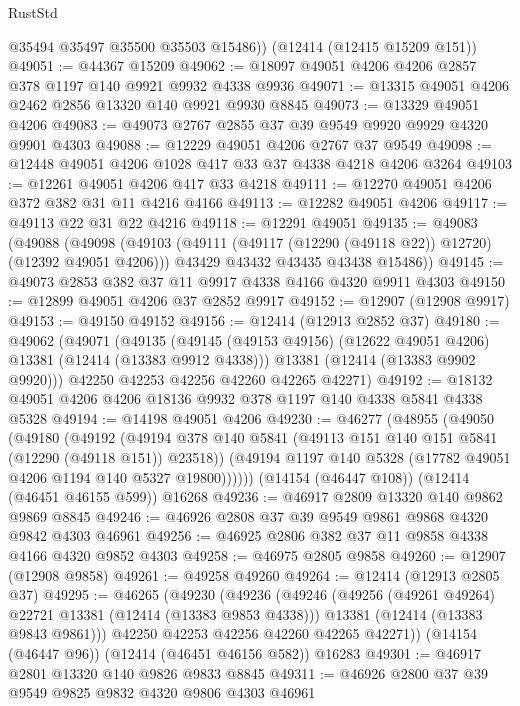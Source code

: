 \begin{lexlean}{RustStd}
\begin{coremodule}
{\begin{coremodule}
{{{{{{{{{{{{{{{{{{{{{{{{{{{{{{{{{{{{{{{{{{{{{{{{{{        @35494
        @35497
        @35500
        @35503
        @15486))
    (@12414 (@12415 @15209 @151))
@49051 := @44367 @15209
@49062 := @18097 @49051 @4206 @4206 @2857 @378 @1197 @140 @9921 @9932 @4338 @9936
@49071 := @13315 @49051 @4206 @2462 @2856 @13320 @140 @9921 @9930 @8845
@49073 := @13329 @49051 @4206
@49083 := @49073 @2767 @2855 @37 @39 @9549 @9920 @9929 @4320 @9901 @4303
@49088 := @12229 @49051 @4206 @2767 @37 @9549
@49098 := @12448 @49051 @4206 @1028 @417 @33 @37 @4338 @4218 @4206 @3264
@49103 := @12261 @49051 @4206 @417 @33 @4218
@49111 := @12270 @49051 @4206 @372 @382 @31 @11 @4216 @4166
@49113 := @12282 @49051 @4206
@49117 := @49113 @22 @31 @22 @4216
@49118 := @12291 @49051
@49135 := @49083
    (@49088
      (@49098
        (@49103 (@49111 (@49117 (@12290 (@49118 @22)) @12720) (@12392 @49051 @4206)))
        @43429
        @43432
        @43435
        @43438
        @15486))
@49145 := @49073 @2853 @382 @37 @11 @9917 @4338 @4166 @4320 @9911 @4303
@49150 := @12899 @49051 @4206 @37 @2852 @9917
@49152 := @12907 (@12908 @9917)
@49153 := @49150 @49152
@49156 := @12414 (@12913 @2852 @37)
@49180 := @49062
    (@49071
      (@49135
        (@49145 (@49153 @49156) (@12622 @49051 @4206) @13381 (@12414 (@13383 @9912 @4338)))
        @13381
        (@12414 (@13383 @9902 @9920)))
      @42250
      @42253
      @42256
      @42260
      @42265
      @42271)
@49192 := @18132 @49051 @4206 @4206 @18136 @9932 @378 @1197 @140 @4338 @5841 @4338 @5328
@49194 := @14198 @49051 @4206
@49230 := @46277
    (@48955
      (@49050
        (@49180
          (@49192
            (@49194 @378 @140 @5841 (@49113 @151 @140 @151 @5841 (@12290 (@49118 @151)) @23518))
            (@49194 @1197 @140 @5328 (@17782 @49051 @4206 @1194 @140 @5327 @19800))))))
    (@14154 (@46447 @108))
    (@12414 (@46451 @46155 @599))
    @16268
@49236 := @46917 @2809 @13320 @140 @9862 @9869 @8845
@49246 := @46926 @2808 @37 @39 @9549 @9861 @9868 @4320 @9842 @4303 @46961
@49256 := @46925 @2806 @382 @37 @11 @9858 @4338 @4166 @4320 @9852 @4303
@49258 := @46975 @2805 @9858
@49260 := @12907 (@12908 @9858)
@49261 := @49258 @49260
@49264 := @12414 (@12913 @2805 @37)
@49295 := @46265
    (@49230
      (@49236
        (@49246
          (@49256 (@49261 @49264) @22721 @13381 (@12414 (@13383 @9853 @4338)))
          @13381
          (@12414 (@13383 @9843 @9861)))
        @42250
        @42253
        @42256
        @42260
        @42265
        @42271))
    (@14154 (@46447 @96))
    (@12414 (@46451 @46156 @582))
    @16283
@49301 := @46917 @2801 @13320 @140 @9826 @9833 @8845
@49311 := @46926 @2800 @37 @39 @9549 @9825 @9832 @4320 @9806 @4303 @46961
}}}}}}}}}}}}}}}}}}}}}}}}}}}}}}}}}}}}}}}}}}}}}}}}}}
\end{coremodule}}
\end{coremodule}
\end{lexlean}
